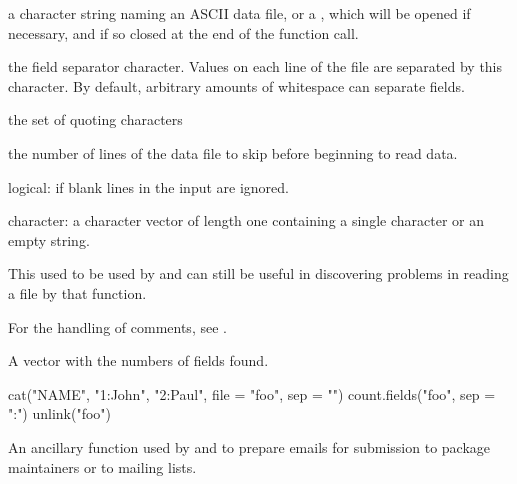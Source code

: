 %
\begin{Arguments}
\begin{ldescription}
\item[\code{file}] a character string naming an ASCII data file, or a
, which will be opened if necessary,
and if so closed at the end of the function call.

\item[\code{sep}] the field separator character.  Values on each line of the
file are separated by this character.  By default, arbitrary amounts
of whitespace can separate fields.

\item[\code{quote}] the set of quoting characters

\item[\code{skip}] the number of lines of the data file to skip before
beginning to read data.

\item[\code{blank.lines.skip}] logical: if  blank lines in the
input are ignored.

\item[\code{comment.char}] character: a character vector of length one
containing a single character or an empty string.
\end{ldescription}
\end{Arguments}
%
\begin{Details}\relax
This used to be used by  and can still be
useful in discovering problems in reading a file by that function.

For the handling of comments, see .
\end{Details}
%
\begin{Value}
A vector with the numbers of fields found.
\end{Value}
%
\begin{SeeAlso}\relax
{}
\end{SeeAlso}
%
\begin{Examples}
\begin{ExampleCode}
cat("NAME", "1:John", "2:Paul", file = "foo", sep = "\n")
count.fields("foo", sep = ":")
unlink("foo")
\end{ExampleCode}
\end{Examples}
%
\begin{Description}\relax
An ancillary function used by  and
 to prepare emails for submission to package
maintainers or to \R{} mailing lists.
\end{Description}
